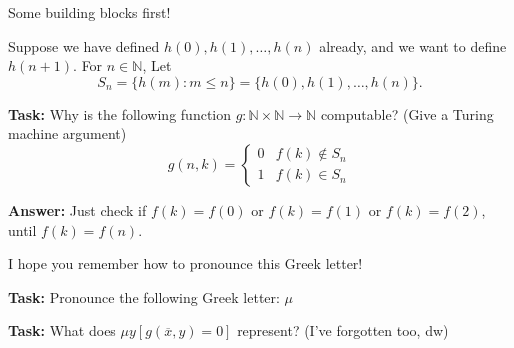 \documentclass{beamer}
\begin{document}
\begin{frame}{Some building blocks first!}

Suppose we have defined $h(0), h(1), \ldots, h(n)$ already, and we want to define $h(n + 1)$. For $n \in \mathbb N$, Let $$S_n = \{h(m): m \leq n\} = \{h(0), h(1), \ldots, h(n)\}.$$

\vspace{2mm}

\textbf{Task:} Why is the following function $g: \mathbb N \times \mathbb N \to \mathbb N$ computable? (Give a Turing machine argument)
$$g(n, k) = \begin{cases}
0 & f(k) \notin S_n\\
1 & f(k) \in S_n
\end{cases}$$

\textbf{Answer:} Just check if $f(k) = f(0)$ or $f(k) = f(1)$ or $f(k) = f(2)$, until $f(k) = f(n)$.

\end{frame}

\begin{frame}{I hope you remember how to pronounce this Greek letter!}

\textbf{Task:} Pronounce the following Greek letter: $\mu$

\vspace{5mm}

\textbf{Task:} What does $\mu y[g(\overline{x}, y) = 0]$ represent? (I've forgotten too, dw)

\end{frame}
\end{document}
